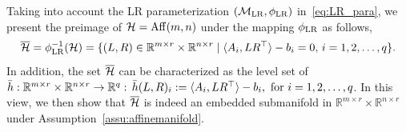 Taking into account the LR parameterization $(\mathcal{M}_{\mathrm{LR}},\phi_{\mathrm{LR}})$ in~\eqref{eq:LR_para}, we present the preimage of $\mathcal{H}=\mathrm{Aff}(m,n)$ under the mapping $\phi_{\mathrm{LR}}$ as follows,
\begin{equation}\label{eq:barH_affine}
    \overline{\mathcal{H}} = \phi_{\mathrm{LR}}^{-1}(\mathcal{H})=\{(L,R)\in\mathbb{R}^{m\times r}\times \mathbb{R}^{n\times r}\mid \langle {A_i,LR^\top} \rangle-b_i=0,\,i=1,2,\ldots,q\}.
\end{equation}
In addition, the set $\overline{\mathcal{H}}$ can be characterized as the level set of $\bar{h}:\mbR^{m\times r}\times \mbR^{n\times r}\to\mbR^{q}:\,\bar{h}(L,R)_i:=\innerp{A_i,LR^\top}-b_i,\ \text{for}\ i=1,2,\ldots,q$. In this view, we then show that $\overline{\mathcal{H}}$ is indeed an embedded submanifold in $\mathbb{R}^{m\times r}\times\mathbb{R}^{n\times r}$ under Assumption~\ref{assu:affinemanifold}.

